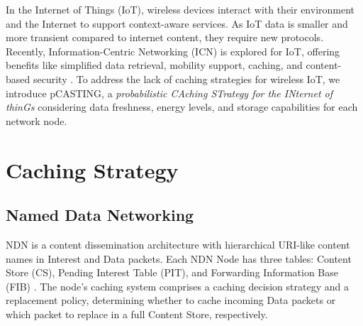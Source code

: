 \documentclass[conference]{IEEEtran}
\begin{document}


In the Internet of Things (IoT), wireless devices interact with their environment and the Internet to support context-aware services. 
As IoT data is smaller and more transient compared to internet content, they require new protocols. Recently, Information-Centric Networking (ICN) is explored 
for IoT, offering benefits like simplified data retrieval, mobility support, caching, and content-based security \cite{b2, b3, b4}. To address the lack of 
caching strategies for wireless IoT, we introduce pCASTING, a \textit{probabilistic CAching STrategy for the INternet of thinGs} considering data freshness, energy levels, 
and storage capabilities for each network node.

\section{Caching Strategy}

\subsection{Named Data Networking}



NDN is a content dissemination architecture with hierarchical URI-like content names in Interest and Data packets. 
Each NDN Node has three tables: Content Store (CS), Pending Interest Table (PIT), and Forwarding Information Base (FIB) \cite{b9}. 
The node's caching system comprises a caching decision strategy and a replacement policy, determining whether to cache incoming Data 
packets or which packet to replace in a full Content Store, respectively.
\end{document}

